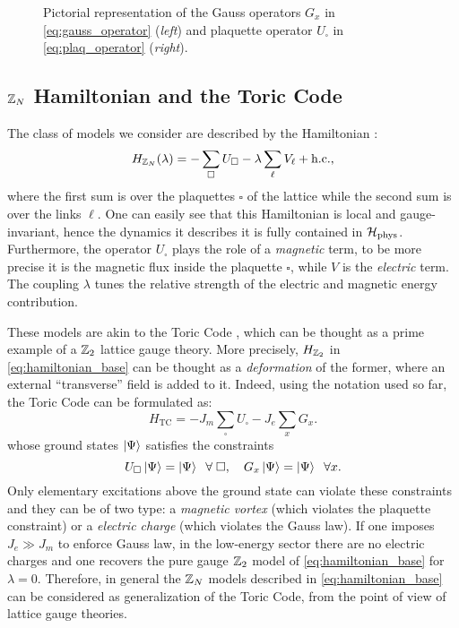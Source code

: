 \begin{figure}[t]
    \centering
    
    \caption{Pictorial representation of the Gauss operators $G_x$ in \eqref{eq:gauss_operator} (\emph{left}) and plaquette operator $U_{\square}$ in \eqref{eq:plaq_operator} (\emph{right}).}
    \label{fig:star_plaq_operators}
\end{figure}


\subsection{\texorpdfstring{$\mathbb{Z}_N$}{Z\_N} Hamiltonian and the Toric Code}%
\label{sub:hamiltonian}

The class of models we consider are described by the Hamiltonian \cite{tagliacozzo2011entanglement, hamma2008adiabatic, trebst2007topological}:
\begin{equation}
    H_{\mathbb{Z}_N}(\lambda) = - \sum_{\square} U_{\square} - \lambda \sum_{\ell} V_{\ell} + \text{h.c.},
    \label{eq:hamiltonian_base}
\end{equation}
where the first sum is over the plaquettes $\square$ of the lattice while the second sum is over the links $\ell$.
One can easily see that this Hamiltonian is local and gauge-invariant, hence the dynamics it describes it is fully contained in $\mathcal{H}_{\text{phys}}$.
Furthermore, the operator $U_{\square}$ plays the role of a \emph{magnetic} term, to be more precise it is the magnetic flux inside the plaquette $\square$, while $V$ is the \emph{electric} term.
The coupling $\lambda$ tunes the relative strength of the electric and magnetic energy contribution.

These models are akin to the Toric Code \cite{kitaev2003fault}, which can be thought as a prime example of a $\mathbb{Z}_2$ lattice gauge theory.
More precisely, $H_{\mathbb{Z}_2}$ in \eqref{eq:hamiltonian_base} can be thought as a \emph{deformation} of the former, where an external ``transverse'' field is added to it.
Indeed, using the notation used so far, the Toric Code can be formulated as:
\begin{equation}
    H_{\text{TC}} = - J_m \sum_{\square} U_{\square} - J_e \sum_{x} G_x.
    \label{eq:hamiltoniana_toric_code}
\end{equation}
whose ground states $\ket{\Psi}$ satisfies the constraints
\begin{equation}
    U_{\square} \ket{\Psi} = \ket{\Psi} \;\; \forall \; \square, \quad
    G_x \ket{\Psi} = \ket{\Psi} \;\; \forall x.
    \label{eq:constraints_gs_toric_code}
\end{equation}
Only elementary excitations above the ground state can violate these constraints and they can be of two type: a \emph{magnetic vortex} (which violates the plaquette constraint) or a \emph{electric charge} (which violates the Gauss law).
If one imposes $J_e \gg J_m$ to enforce Gauss law, in the low-energy sector there are no electric charges and one recovers the pure gauge $\mathbb{Z}_2$ model of \eqref{eq:hamiltonian_base} for $\lambda = 0$.
Therefore, in general the $\mathbb{Z}_N$ models described in \eqref{eq:hamiltonian_base} can be considered as generalization of the Toric Code, from the point of view of lattice gauge theories.


